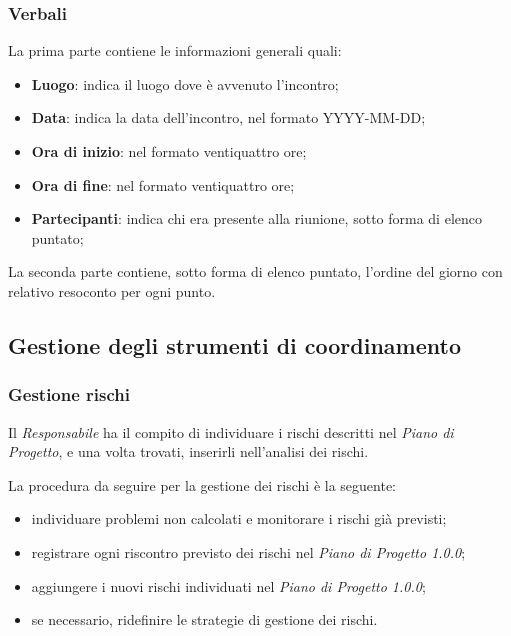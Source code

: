    		\subsubsection{Verbali}
   		La prima parte contiene le informazioni generali quali:
   		\begin{itemize}
   			\item \textbf{Luogo}: indica il luogo dove è avvenuto l'incontro;
   			\item \textbf{Data}: indica la data dell'incontro, nel formato YYYY-MM-DD;
   			\item \textbf{Ora di inizio}: nel formato ventiquattro ore;
   			\item \textbf{Ora di fine}: nel formato ventiquattro ore;
   			\item \textbf{Partecipanti}: indica chi era presente alla riunione, sotto forma di elenco puntato;
   		\end{itemize}
   		La seconda parte contiene, sotto forma di elenco puntato, l'ordine del giorno con relativo resoconto per ogni punto.
   		
   	\subsection{Gestione degli strumenti di coordinamento}
  
   		\subsubsection{Gestione rischi}
   		Il \textit{Responsabile} ha il compito di individuare i rischi descritti nel \textit{Piano di Progetto\docs}, e una volta trovati, inserirli nell'analisi dei rischi.
   		
   		La procedura da seguire per la gestione dei rischi è la seguente:
   		\begin{itemize}
   			\item individuare problemi non calcolati e monitorare i rischi già previsti;
   			\item registrare ogni riscontro previsto dei rischi nel \textit{Piano di Progetto 1.0.0\docs};
   			\item aggiungere i nuovi rischi individuati nel \textit{Piano di Progetto 1.0.0\docs};
   			\item se necessario, ridefinire le strategie di gestione dei rischi.
   		\end{itemize}
   		

